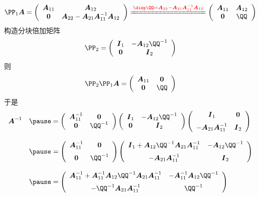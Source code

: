 \begin{frame}
  \begin{footnotesize}
    $$
    \PP_1\A = \left(
    \begin{array}{cc}
      \A_{11} & \A_{12} \\
      \zero & \A_{22}-\A_{21}\A_{11}^{-1}\A_{12}
    \end{array}
    \right)\xlongequal[]{\red{\disp \QQ=\A_{22}-\A_{21}\A_{11}^{-1}\A_{12}}}
    \left(
    \begin{array}{cc}
      \A_{11} & \A_{12} \\
      \zero & \QQ
    \end{array}
    \right)
    $$ \pause
    构造分块倍加矩阵
    $$
    \PP_2 = \left(
    \begin{array}{cc}
      \II_1 & -\A_{12}\QQ^{-1}\\
      \zero & \II_2
    \end{array}
    \right)
    $$ \pause
    则
    $$
    \PP_2\PP_1\A = \left(
    \begin{array}{cc}
      \A_{11} & \zero\\
      \zero & \QQ
    \end{array}
    \right)
    $$ \pause
    于是
    $$
    \begin{array}{rl}
      \A^{-1} & \pause= \left(
      \begin{array}{cc}
        \A_{11}^{-1} & \zero\\
        \zero & \QQ^{-1}
      \end{array}
      \right)\left(
      \begin{array}{cc}
        \II_1 & -\A_{12}\QQ^{-1}\\
        \zero & \II_2
      \end{array}
      \right)\left(
      \begin{array}{cc}
        \II_1 & \zero\\[0.2cm]
        -\A_{21}\A_{11}^{-1} & \II_2
      \end{array}
      \right) \\[0.3in]
      & \pause= \left(
      \begin{array}{cc}
        \A_{11}^{-1} & \zero\\[0.2cm]
        \zero & \QQ^{-1}
      \end{array}
      \right)\left(
      \begin{array}{cc}
        \II_1+ \A_{12}\QQ^{-1}\A_{21}\A_{11}^{-1}& -\A_{12}\QQ^{-1}\\[0.2cm]
        -\A_{21}\A_{11}^{-1} & \II_2
      \end{array}
      \right)\\[0.3in]
      & \pause= \left(
      \begin{array}{cc}
        \A_{11}^{-1}+ \A_{11}^{-1}\A_{12}\QQ^{-1}\A_{21}\A_{11}^{-1}& -\A_{11}^{-1}\A_{12}\QQ^{-1}\\[0.2cm]
        -\QQ^{-1}\A_{21}\A_{11}^{-1} & \QQ^{-1}
      \end{array}
      \right)
    \end{array}
    $$
  \end{footnotesize}
\end{frame}



